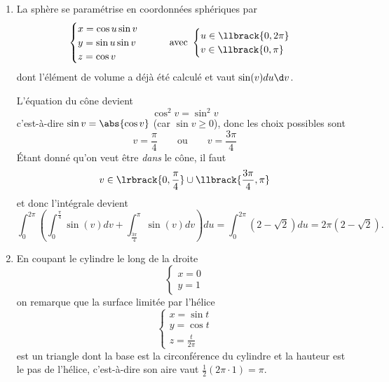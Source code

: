 \begin{enumerate}
\item La sphère se paramétrise en coordonnées sphériques par
\begin{equation*}
\begin{cases}
x = \cos u \sin v\\
y = \sin u \sin v\\
z = \cos v
\end{cases} \qquad\text{avec }%
\begin{cases}
u \in \llbrack {0, 2\pi}\\
v \in \llbrack {0, \pi}
\end{cases}
\end{equation*}
dont l'élément de volume a déjà été calculé et vaut $\sin(v) d u \d
v$.

L'équation du cône devient
\begin{equation*}
\cos^2 v = \sin^2 v
\end{equation*}
c'est-à-dire $\sin v = \abs{\cos v}$ (car $\sin v \geq 0$), donc les
choix possibles sont
\begin{equation*}
v = \frac\pi4 \qquad\text{ou}\qquad v = \frac{3\pi}4
\end{equation*}
Étant donné qu'on veut être \emph{dans} le cône, il faut
\begin{equation*}
v \in \lrbrack{0, \frac\pi4}\cup \llbrack{\frac{3\pi}4, \pi}
\end{equation*}
et donc l'intégrale devient
\begin{equation*}
\int_0^{2\pi} \left(\int_0^{\frac\pi4} \sin(v)d v +
\int_{\frac{3\pi}4}^\pi \sin(v) d v\right)d u =
\int_{0}^{2\pi} (2 - \sqrt 2) d u = 2 \pi (2 - \sqrt 2).
\end{equation*}

\item En coupant le cylindre le long de la droite
\begin{equation*}
\begin{cases}
x = 0\\ y = 1
\end{cases}
\end{equation*}
on remarque que la surface limitée par l'hélice
\begin{equation*}
\begin{cases}
x = \sin t\\
y = \cos t\\
z = \frac t {2\pi}
\end{cases}
\end{equation*}
est un triangle dont la base est la circonférence du cylindre et la
hauteur est le pas de l'hélice, c'est-à-dire son aire vaut $\frac12
(2\pi \cdot 1) = \pi$.
\end{enumerate}

